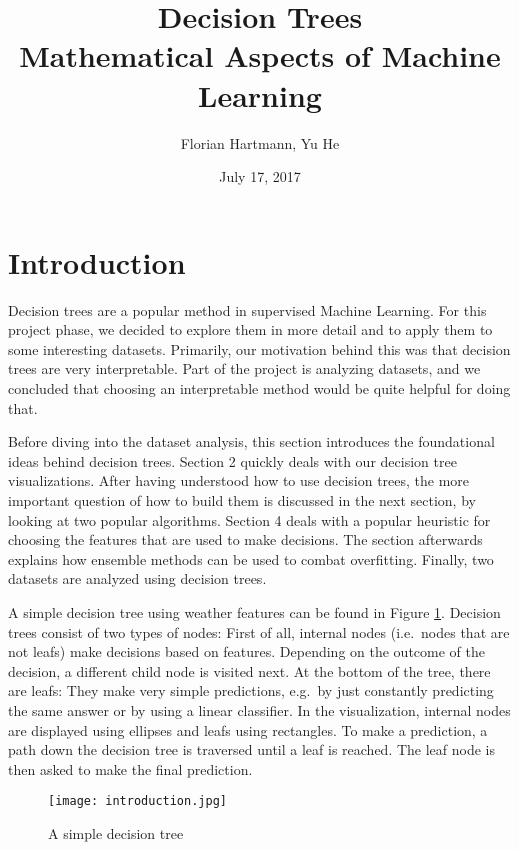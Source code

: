 \documentclass[a4paper]{article}
\title{Decision Trees\\\large{Mathematical Aspects of Machine Learning}}
\author{Florian Hartmann, Yu He}
\date{July 17, 2017}
\begin{document}
\maketitle

\section{Introduction}

Decision trees are a popular method in supervised Machine Learning. For this project phase, we decided to explore them in more detail and to apply them to some interesting datasets. Primarily, our motivation behind this was that decision trees are very interpretable. Part of the project is analyzing datasets, and we concluded that choosing an interpretable method would be quite helpful for doing that.

Before diving into the dataset analysis, this section introduces the foundational ideas behind decision trees. Section 2 quickly deals with our decision tree visualizations. After having understood how to use decision trees, the more important question of how to build them is discussed in the next section, by looking at two popular algorithms. Section 4 deals with a popular heuristic for choosing the features that are used to make decisions.
The section afterwards explains how ensemble methods can be used to combat overfitting. Finally, two datasets are analyzed using decision trees.

A simple decision tree using weather features can be found in Figure \ref{fig:simple}. Decision trees consist of two types of nodes: First of all, internal nodes (i.e.\ nodes that are not leafs) make decisions based on features. Depending on the outcome of the decision, a different child node is visited next. At the bottom of the tree, there are leafs: They make very simple predictions, e.g.\ by just constantly predicting the same answer or by using a linear classifier. In the visualization, internal nodes are displayed using ellipses and leafs using rectangles. To make a prediction, a path down the decision tree is traversed until a leaf is reached. The leaf node is then asked to make the final prediction.

\begin{figure}
	\centering
	\texttt{[image: introduction.jpg]}
    \caption{A simple decision tree}
    \label{fig:simple}
\end{figure}
\end{document}
